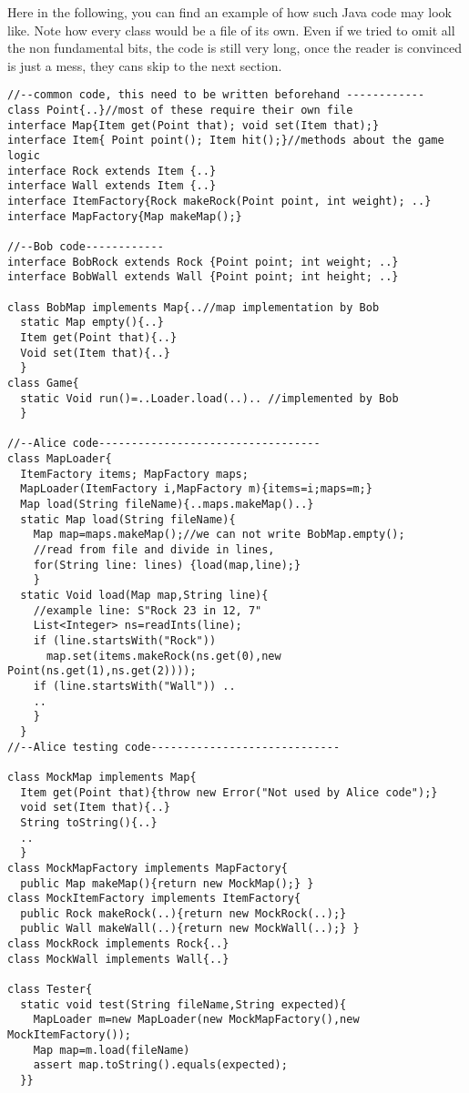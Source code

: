 \documentclass[submission,copyright,creativecommons]{eptcs}
\begin{document}
Here in the following, you can find an example of how such Java code may look like.
Note how every class would be a file of its own.
Even if we tried to omit all the non fundamental bits,
the code is still very long, once the reader is convinced is just a mess, they
cans skip to the next section.
\begin{lstlisting}
//--common code, this need to be written beforehand ------------
class Point{..}//most of these require their own file
interface Map{Item get(Point that); void set(Item that);}
interface Item{ Point point(); Item hit();}//methods about the game logic
interface Rock extends Item {..}
interface Wall extends Item {..}
interface ItemFactory{Rock makeRock(Point point, int weight); ..}
interface MapFactory{Map makeMap();}

//--Bob code------------
interface BobRock extends Rock {Point point; int weight; ..}
interface BobWall extends Wall {Point point; int height; ..}

class BobMap implements Map{..//map implementation by Bob
  static Map empty(){..}
  Item get(Point that){..}
  Void set(Item that){..}
  }
class Game{
  static Void run()=..Loader.load(..).. //implemented by Bob
  }

//--Alice code----------------------------------
class MapLoader{
  ItemFactory items; MapFactory maps;
  MapLoader(ItemFactory i,MapFactory m){items=i;maps=m;}
  Map load(String fileName){..maps.makeMap()..}
  static Map load(String fileName){
    Map map=maps.makeMap();//we can not write BobMap.empty();
    //read from file and divide in lines,
    for(String line: lines) {load(map,line);}
    }
  static Void load(Map map,String line){
    //example line: S"Rock 23 in 12, 7"
    List<Integer> ns=readInts(line);
    if (line.startsWith("Rock"))
      map.set(items.makeRock(ns.get(0),new Point(ns.get(1),ns.get(2))));
    if (line.startsWith("Wall")) ..
    ..
    }
  }
//--Alice testing code-----------------------------
  
class MockMap implements Map{
  Item get(Point that){throw new Error("Not used by Alice code");}
  void set(Item that){..}
  String toString(){..}
  ..
  }
class MockMapFactory implements MapFactory{
  public Map makeMap(){return new MockMap();} }
class MockItemFactory implements ItemFactory{
  public Rock makeRock(..){return new MockRock(..);}
  public Wall makeWall(..){return new MockWall(..);} }
class MockRock implements Rock{..}
class MockWall implements Wall{..}

class Tester{
  static void test(String fileName,String expected){
    MapLoader m=new MapLoader(new MockMapFactory(),new MockItemFactory());
    Map map=m.load(fileName)
    assert map.toString().equals(expected);
  }}
\end{lstlisting}
\end{document}
